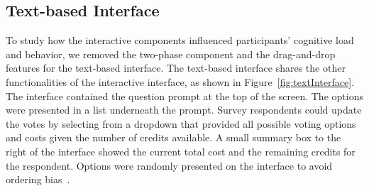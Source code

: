 \subsection{Text-based Interface}To study how the interactive components influenced participants' cognitive load and behavior, we removed the two-phase component and the drag-and-drop features for the text-based interface. The text-based interface shares the other functionalities of the interactive interface, as shown in Figure~\ref{fig:textInterface}. The interface contained the question prompt at the top of the screen. The options were presented in a list underneath the prompt. Survey respondents could update the votes by selecting from a dropdown that provided all possible voting options and costs given the number of credits available. A small summary box to the right of the interface showed the current total cost and the remaining credits for the respondent. Options were randomly presented on the interface to avoid ordering bias~\cite{ferberOrderBiasMail1952, couperWebSurveyDesign2001}.









